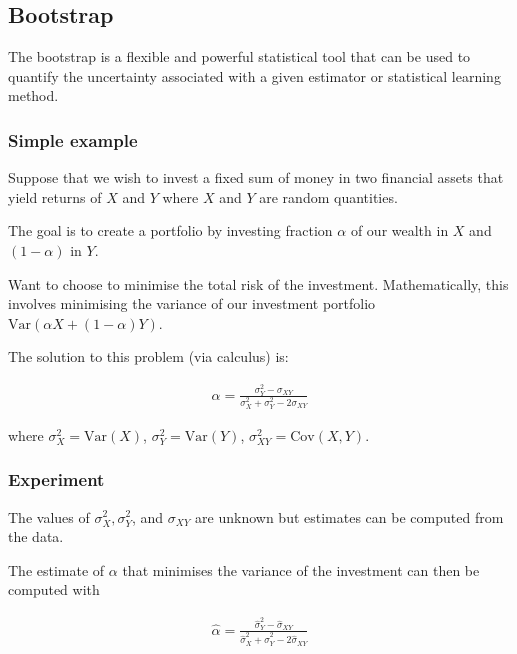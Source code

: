 \subsection{Bootstrap}

\indent 

The bootstrap is a flexible and powerful statistical tool that can be used to quantify the uncertainty associated with a given estimator or statistical learning method.

\subsubsection{Simple example}

\indent 

Suppose that we wish to invest a fixed sum of money in two financial assets that yield returns of $X$ and $Y$ where $X$ and $Y$ are random quantities.

The goal is to create a portfolio by investing fraction $\alpha$ of our wealth in $X$ and $(1-\alpha)$ in $Y$.

Want to choose to minimise the total risk of the investment. Mathematically, this involves minimising the variance of our investment portfolio $\text{Var}(\alpha X+(1-\alpha)Y)$.

The solution to this problem (via calculus) is:

\begin{align*}
    \alpha = \frac{\sigma_Y^2 -\sigma_{XY}}{\sigma_X^2+\sigma_Y^2 - 2\sigma_{XY}}
\end{align*}

where $\sigma_X^2 = \text{Var}(X)$, $\sigma_Y^2 = \text{Var}(Y)$, $\sigma_{XY}^2 = \text{Cov}(X,Y)$.

\subsubsection{Experiment}

\indent

The values of $\sigma_X^2,\sigma_Y^2$, and $\sigma_{XY}$ are unknown but estimates can be computed from the data.

The estimate of $\alpha$ that minimises the variance of the investment can then be computed with

\begin{align*}
    \widehat{\alpha} = \frac{\widehat{\sigma}_Y^2 -\widehat{\sigma}_{XY}}{\widehat{\sigma}_X^2+\widehat{\sigma}_Y^2 - 2\widehat{\sigma}_{XY}}
\end{align*}

